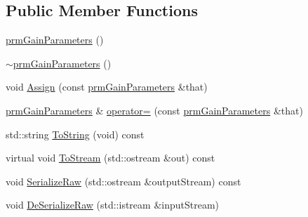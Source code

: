 \subsection*{Public Member Functions}
\begin{DoxyCompactItemize}
\item 
\hyperlink{classprm_gain_parameters_aeeb8ecc12e4f0badd632fc94499fca81}{prm\-Gain\-Parameters} ()
\item 
\hyperlink{classprm_gain_parameters_a6241287dd1dcc722f10d911951a09800}{$\sim$prm\-Gain\-Parameters} ()
\item 
void \hyperlink{classprm_gain_parameters_a501603f764895ddf93366c85a7e959db}{Assign} (const \hyperlink{classprm_gain_parameters}{prm\-Gain\-Parameters} \&that)
\item 
\hyperlink{classprm_gain_parameters}{prm\-Gain\-Parameters} \& \hyperlink{classprm_gain_parameters_a54cff625c32a9fffce362fb93afd6d89}{operator=} (const \hyperlink{classprm_gain_parameters}{prm\-Gain\-Parameters} \&that)
\item 
std\-::string \hyperlink{classprm_gain_parameters_aeebeed19398c5a9ef30e9307af23f341}{To\-String} (void) const 
\item 
virtual void \hyperlink{classprm_gain_parameters_a29d0dee95d45080a0bbb6d99a7f7013c}{To\-Stream} (std\-::ostream \&out) const 
\item 
void \hyperlink{classprm_gain_parameters_a818f720b8731f8b53c518251b64b4fca}{Serialize\-Raw} (std\-::ostream \&output\-Stream) const 
\item 
void \hyperlink{classprm_gain_parameters_a9d7a3000a264ff71cafeb6658df942fa}{De\-Serialize\-Raw} (std\-::istream \&input\-Stream)
\end{DoxyCompactItemize}
